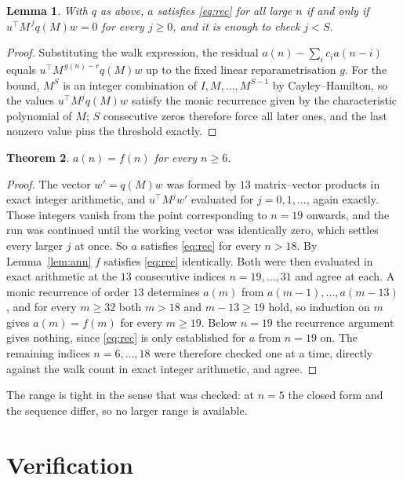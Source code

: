 \documentclass[11pt,a4paper]{article}
\theoremstyle{plain}
\newtheorem{theorem}{Theorem}
\newtheorem{lemma}[theorem]{Lemma}
\theoremstyle{definition}
\begin{document}
\begin{lemma}\label{lem:crit}
With $q$ as above, $a$ satisfies \eqref{eq:rec} for all large $n$ if and only if
$u^{\!\top}M^{\,j}q(M)w=0$ for every $j\ge0$, and it is enough to check $j<S$.
\end{lemma}

\begin{proof}
Substituting the walk expression, the residual $a(n)-\sum_ic_ia(n-i)$ equals
$u^{\!\top}M^{\,g(n)-r}q(M)w$ up to the fixed linear reparametrisation $g$. For the bound,
$M^{S}$ is an integer combination of $I,M,\dots,M^{S-1}$ by Cayley--Hamilton, so the values
$u^{\!\top}M^{j}q(M)w$ satisfy the monic recurrence given by the characteristic polynomial of
$M$; $S$ consecutive zeros therefore force all later ones, and the last nonzero value pins the
threshold exactly.
\end{proof}

\begin{theorem}
$a(n)=f(n)$ for every $n\ge6$.
\end{theorem}

\begin{proof}
The vector $w'=q(M)w$ was formed by $13$ matrix--vector products in exact integer
arithmetic, and $u^{\!\top}M^{j}w'$ evaluated for $j=0,1,\dots$, again exactly. Those integers
vanish from the point corresponding to $n=19$ onwards, and the run was continued until the
working vector was identically zero, which settles every larger $j$ at once. So $a$ satisfies
\eqref{eq:rec} for every $n>18$. By Lemma~\ref{lem:ann} $f$ satisfies \eqref{eq:rec}
identically. Both were then evaluated in exact arithmetic at the $13$ consecutive indices
$n=19,\dots,31$ and agree at each. A monic recurrence of order $13$
determines $a(m)$ from $a(m-1),\dots,a(m-13)$, and for every $m\ge32$ both
$m>18$ and $m-13\ge19$ hold, so induction on $m$ gives $a(m)=f(m)$ for every
$m\ge19$.
Below $n=19$ the recurrence argument gives nothing, since \eqref{eq:rec} is only
established for $a$ from $n=19$ on. The remaining indices $n=6,\dots,18$ were
therefore checked one at a time, directly against the walk count in exact integer arithmetic,
and agree.
\end{proof}

The range is tight in the sense that was checked: at $n=5$ the closed form and the sequence differ, so no larger range is available.

\section{Verification}
\end{document}
